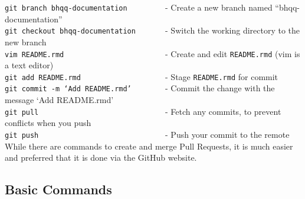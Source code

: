 \documentclass{article}
\begin{document}
\noindent
\texttt{git branch bhqq-documentation}\verb+         +- Create a new branch named ``bhqq-documentation''\\
\texttt{git checkout bhqq-documentation}\verb+       +- Switch the working directory to the new branch\\
\texttt{vim README.rmd}\verb+                        +- Create and edit \texttt{README.rmd} (vim is a text editor)\\
\texttt{git add README.rmd}\verb+                    +- Stage \texttt{README.rmd} for commit\\
\texttt{git commit -m `Add README.rmd'}\verb+        +- Commit the change with the message `Add README.rmd'\\
\texttt{git pull}\verb+                              +- Fetch any commits, to prevent conflicts when you push\\
\texttt{git push}\verb+                              +- Push your commit to the remote\\

\noindent
While there are commands to create and merge Pull Requests, it is much easier and preferred that it is done via the GitHub website.

\pagebreak

\subsection{Basic Commands}
\end{document}
